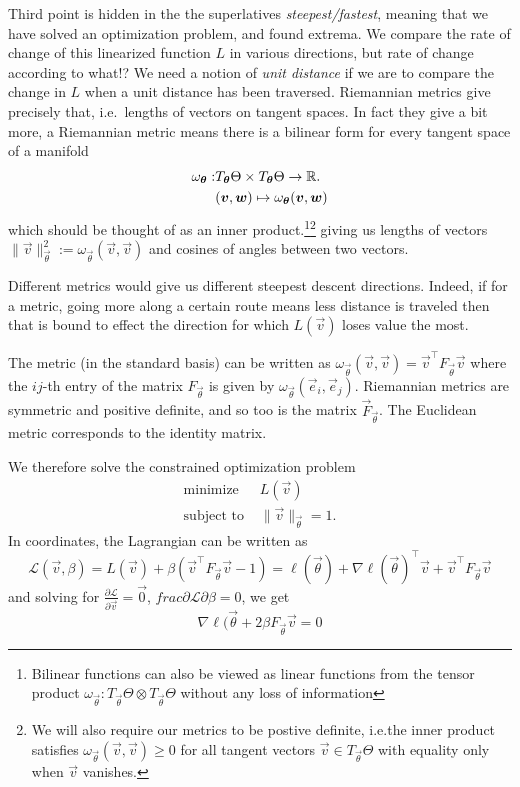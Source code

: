 \documentclass[12pt]{amsart}
\begin{document}
Third point is hidden in the the superlatives \emph{steepest/fastest}, meaning that we have solved an optimization problem, and found extrema. We compare the rate of change of this linearized function $L$ in various directions, but rate of change according to what!? We need a notion of \emph{unit distance} if we are to compare the change in $L$ when a unit distance has been traversed. Riemannian metrics give precisely that, i.e.\ lengths of vectors on tangent spaces. In fact they give a bit more, a Riemannian metric means there is a bilinear form for every tangent space of a manifold
 \begin{align*}
 		\omega_{\mathbf{\boldsymbol{\theta}}} :& T_{\mathbf{\boldsymbol{\theta}}}\Theta \times T_{\mathbf{\boldsymbol{\theta}}}\Theta \to \mathbb{R}.\\
 		& (\mathbf{\boldsymbol{v}}, \mathbf{\boldsymbol{w}}) \mapsto \omega_{\mathbf{\boldsymbol{\theta}}}(\mathbf{\boldsymbol{v}}, \mathbf{\boldsymbol{w}})
 \end{align*}
 which should be thought of as an inner product.\footnote{Bilinear functions can also be viewed as linear functions from the tensor product $\omega_{\vec{\theta}} : T_{\vec{\theta}}\Theta \otimes T_{\vec{\theta}}\Theta$ without any loss of information}\footnote{We will also require our metrics to be postive definite, i.e.the inner product satisfies $\omega_{\vec{\theta}} (\vec{v}, \vec{v}) \geq 0$ for all tangent vectors $\vec{v} \in T_{\vec{\theta}}\Theta$ with equality only when $\vec{v}$ vanishes.} giving us lengths of vectors $\|\vec{v}\|_{\vec{\theta}}^2:= \omega_{\vec{\theta}}(\vec{v}, \vec{v})$ and cosines of angles between two vectors.
 
 Different metrics would give us different steepest descent directions. Indeed, if for a metric, going more along a certain route means less distance is traveled then that is bound to effect the direction for which $L(\vec{v})$ loses value the most. 
 
 The metric (in the standard basis) can be written as $\omega_{\vec{\theta}}(\vec{v}, \vec{v}) = \vec{v}^\top F_{\vec{\theta}} \vec{v}$ where the $ij$-th entry of the matrix $F_{\vec{\theta}}$ is given by $\omega_{\vec{\theta}}(\vec{e}_i, \vec{e}_j)$. Riemannian metrics are symmetric and positive definite, and so too is the matrix $\vec{F}_{\vec{\theta}}$. The Euclidean metric corresponds to the identity matrix. 
 
 We therefore solve the constrained optimization problem
\begin{align*}
	\text{minimize }  & L(\vec{v}) \\
	\text{subject to } & \|\vec{v}\|_{\vec{\theta}} = 1.
\end{align*} 	
In coordinates, the Lagrangian can be written as 
\[
	\mathcal{L}(\vec{v}, \beta) = L(\vec{v}) + \beta(\vec{v}^\top F_{\vec{\theta}} \vec{v} - 1) = \ell(\vec{\theta}) + \nabla \ell(\vec{\theta})^\top \vec{v} + \vec{v}^\top F_{\vec{\theta}} \vec{v}
\]
and solving for $\frac{\partial \mathcal{L}}{\partial \vec{v}} = \vec{0}$, $frac{\partial \mathcal{L}}{\partial \beta} = 0$, we get
\[
	\nabla\ell(\vec{\theta} + 2 \beta F_\vec{\theta} \vec{v} = 0
\]
\end{document}
